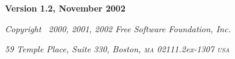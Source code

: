 ﻿%
\chapter[\thefdl]{{\LARGE\thefdl}}\label{label_fdl}

\par \narrowbaselines \par

\newenvironment{anumerate}
  {\def\theenumi{\Alph{enumi}}%
   \enumerate}
  {\endenumerate}

\begin{center}
 \textbf{Version 1.2, November 2002}

 \textit{Copyright \textcopyright\ 2000, 2001, 2002 Free Software Foundation, Inc.}

 \textit{59 Temple Place, Suite 330, Boston, \textsc{ma} 02111\raise.2ex\hbox{-}1307 \textsc{usa}}

\end{center}

\bgroup
\footnotesize

\makeatletter
\def \section {%
    \@startsection{section}{1}{\z@}%
    {0.6\Cvs}{0.4\Cvs}%
    {\normalfont \small \headfont \raggedright}}
\setlength\columnsep{1.5em}
\makeatother

